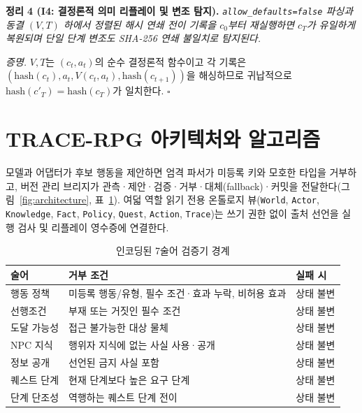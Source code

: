 \noindent\textbf{정리 4 (I4: 결정론적 의미 리플레이 및 변조 탐지).} \emph{\texttt{allow\_}\allowbreak\texttt{defaults=}\allowbreak\texttt{false} 파싱과 동결 $(V,T)$ 하에서 정렬된 해시 연쇄 전이 기록을 $c_0$부터 재실행하면 $c_T$가 유일하게 복원되며 단일 단계 변조도 SHA-256 연쇄 불일치로 탐지된다.}
\par\noindent\textit{증명.} $V,T$는 $(c_t,a_t)$의 순수 결정론적 함수이고 각 기록은 $(\mathrm{hash}(c_t),\allowbreak a_t,\allowbreak V(c_t,a_t),\allowbreak\mathrm{hash}(c_{t+1}))$을 해싱하므로 귀납적으로 $\mathrm{hash}(c'_T)=\mathrm{hash}(c_T)$가 일치한다. \hfill$\square$

\section{TRACE-RPG 아키텍처와 알고리즘}\label{sec:arch}
모델과 어댑터가 후보 행동을 제안하면 엄격 파서가 미등록 키와 모호한 타입을 거부하고, 버전 관리 브리지가 관측·제안·검증·거부·대체(fallback)·커밋을 전달한다(그림~\ref{fig:architecture}, 표~\ref{tab:validators}). 여덟 역할 읽기 전용 온톨로지 뷰(\texttt{World}, \texttt{Actor}, \texttt{Knowledge}, \texttt{Fact}, \texttt{Policy}, \texttt{Quest}, \texttt{Action}, \texttt{Trace})는 쓰기 권한 없이 출처 선언을 실행 검사 및 리플레이 영수증에 연결한다.

\begin{table}[!tbp]
\caption{인코딩된 7술어 검증기 경계}
\label{tab:validators}
\centering
\footnotesize
\begin{tabularx}{\columnwidth}{@{}>{\raggedright\arraybackslash}p{}>{\raggedright\arraybackslash}X>{\raggedright\arraybackslash}p{}@{}}
\toprule
\textbf{술어} & \textbf{거부 조건} & \textbf{실패 시} \\
\midrule
행동 정책 & 미등록 행동/유형, 필수 조건·효과 누락, 비허용 효과 & 상태 불변 \\
선행조건 & 부재 또는 거짓인 필수 조건 & 상태 불변 \\
도달 가능성 & 접근 불가능한 대상 물체 & 상태 불변 \\
NPC 지식 & 행위자 지식에 없는 사실 사용·공개 & 상태 불변 \\
정보 공개 & 선언된 금지 사실 포함 & 상태 불변 \\
퀘스트 단계 & 현재 단계보다 높은 요구 단계 & 상태 불변 \\
단계 단조성 & 역행하는 퀘스트 단계 전이 & 상태 불변 \\
\bottomrule
\end{tabularx}
\end{table}

